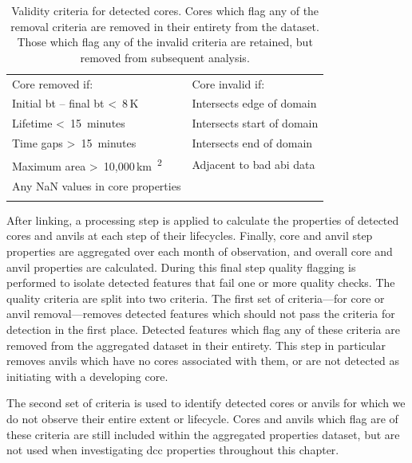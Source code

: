 \begin{table}[b]
\centering
\begin{tabular}{ll}
\tophline
Core removed if:                                                    & Core invalid if: \\
\middlehline
Initial \acrshort{bt} -- final \acrshort{bt} \textless~8\,\unit{K}  & Intersects edge of domain \\
Lifetime \textless~15~minutes                                       & Intersects start of domain \\
Time gaps \textgreater~15~minutes                                   & Intersects end of domain \\
Maximum area \textgreater~10,000\,\unit{km\textsuperscript{2}}      & Adjacent to bad \acrshort{abi} data \\
Any NaN values in core properties                                   & \\
\bottomhline
\end{tabular}
\caption[
Validity criteria for detected cores
]{
Validity criteria for detected cores. Cores which flag any of the removal criteria are removed in their entirety from the dataset. Those which flag any of the invalid criteria are retained, but removed from subsequent analysis.}
\label{table:core_validity_criteria}
\end{table}

After linking, a processing step is applied to calculate the properties of detected cores and anvils at each step of their lifecycles.
Finally, core and anvil step properties are aggregated over each month of observation, and overall core and anvil properties are calculated.
During this final step quality flagging is performed to isolate detected features that fail one or more quality checks.
The quality criteria are split into two criteria.
The first set of criteria---for core or anvil removal---removes detected features which should not pass the criteria for detection in the first place.
Detected features which flag any of these criteria are removed from the aggregated dataset in their entirety.
This step in particular removes anvils which have no cores associated with them, or are not detected as initiating with a developing core.

The second set of criteria is used to identify detected cores or anvils for which we do not observe their entire extent or lifecycle.
Cores and anvils which flag are of these criteria are still included within the aggregated properties dataset, but are not used when investigating \acrshort{dcc} properties throughout this chapter.

